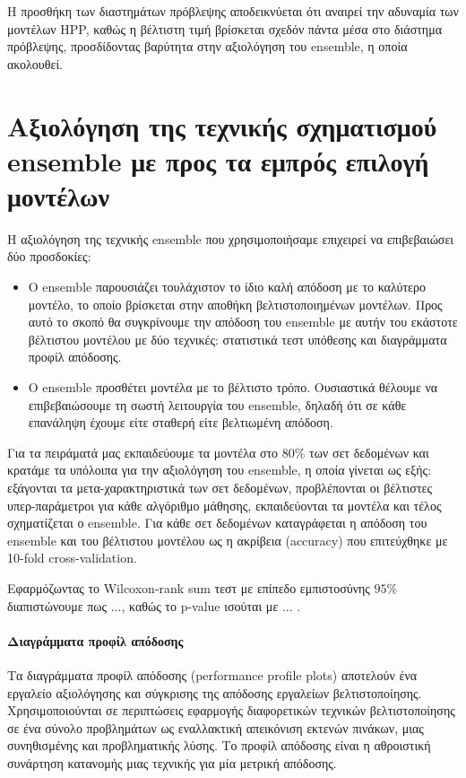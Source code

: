 Η προσθήκη των διαστημάτων πρόβλεψης αποδεικνύεται ότι αναιρεί την αδυναμία των μοντέλων HPP, καθώς η βέλτιστη τιμή βρίσκεται σχεδόν πάντα μέσα στο διάστημα πρόβλεψης, προσδίδοντας βαρύτητα στην αξιολόγηση του ensemble, η οποία ακολουθεί.  
\section{Αξιολόγηση της τεχνικής σχηματισμού ensemble με προς τα εμπρός επιλογή μοντέλων} \label{section:tensemble}
H αξιολόγηση της τεχνικής ensemble που χρησιμοποιήσαμε επιχειρεί να επιβεβαιώσει δύο προσδοκίες:
\begin{itemize}
	\item Ο ensemble παρουσιάζει τουλάχιστον το ίδιο καλή απόδοση με το καλύτερο μοντέλο, το οποίο βρίσκεται στην αποθήκη βελτιστοποιημένων μοντέλων. Προς αυτό το σκοπό θα συγκρίνουμε την απόδοση του ensemble με αυτήν του εκάστοτε βέλτιστου μοντέλου με δύο τεχνικές: στατιστικά τεστ υπόθεσης και διαγράμματα προφίλ απόδοσης.
	\item Ο ensemble προσθέτει μοντέλα με το βέλτιστο τρόπο. Ουσιαστικά θέλουμε να επιβεβαιώσουμε τη σωστή λειτουργία του ensemble, δηλαδή ότι σε κάθε επανάληψη έχουμε είτε σταθερή είτε βελτιωμένη απόδοση.
\end{itemize}

Για τα πειράματά μας εκπαιδεύουμε τα μοντέλα στο $80\%$ των σετ δεδομένων και κρατάμε τα υπόλοιπα για την αξιολόγηση του ensemble, η οποία γίνεται ως εξής: εξάγονται τα μετα-χαρακτηριστικά των σετ δεδομένων, προβλέπονται οι βέλτιστες υπερ-παράμετροι για κάθε αλγόριθμο μάθησης, εκπαιδεύονται τα μοντέλα και τέλος σχηματίζεται ο ensemble. Για κάθε σετ δεδομένων καταγράφεται η απόδοση του ensemble και του βέλτιστου μοντέλου ως η ακρίβεια (accuracy) που επιτεύχθηκε με 10-fold cross-validation. 

Εφαρμόζωντας το Wilcoxon-rank sum τεστ με επίπεδο εμπιστοσύνης $95\%$ διαπιστώνουμε πως ..., καθώς το p-value ισούται με ... .

\paragraph{Διαγράμματα προφίλ απόδοσης} 	Τα διαγράμματα προφίλ απόδοσης (performance profile plots) \citep{Dolan2002} αποτελούν ένα εργαλείο αξιολόγησης και σύγκρισης της απόδοσης εργαλείων βελτιστοποίησης. Χρησιμοποιούνται σε περιπτώσεις εφαρμογής διαφορετικών τεχνικών βελτιστοποίησης σε ένα σύνολο προβλημάτων ως εναλλακτική απεικόνιση εκτενών πινάκων, μιας συνηθισμένης και προβληματικής λύσης. Το προφίλ απόδοσης είναι η αθροιστική συνάρτηση κατανομής μιας τεχνικής για μία μετρική απόδοσης.

